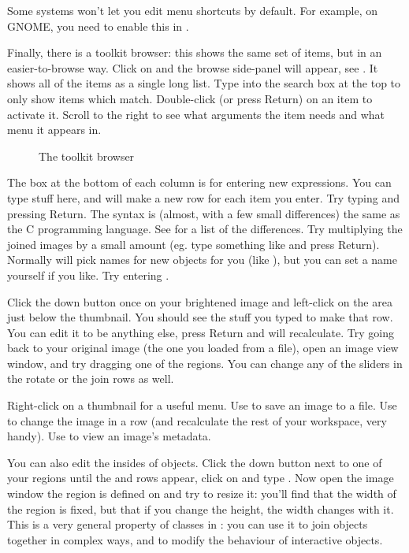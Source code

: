 Some systems won't let you edit menu shortcuts by default. For example,
on GNOME, you need to enable this in .

Finally, there is a toolkit browser: this shows the same set of items, but in
an easier-to-browse way. Click on  and the
browse side-panel will appear, see . It shows all of the items
as a single long list. Type into the search box at the top to only show items
which match. Double-click (or press Return) on an item to activate it. Scroll
to the right to see what arguments the item needs and what menu it appears in.

\begin{figure}
\caption{The toolkit browser}
\end{figure}

The box at the bottom of each column is for entering new expressions. You
can type stuff here, and \nip{} will make a new row for each item you
enter. Try typing  and pressing Return. The syntax is (almost,
with a few small differences) the same as the C programming language. See
 for a list of the differences. Try
multiplying the joined images by a small amount (eg. type something like
 and press Return). Normally \nip{} will pick names for new
objects for you (like ), but you can set a name yourself if you like.
Try entering .

Click the down button once on your brightened image and left-click on the area
just below the thumbnail. You should see the stuff you typed to make that row.
You can edit it to be anything else, press Return and \nip{} will recalculate.
Try going back to your original image (the one you loaded from a file),
open an image view window, and try dragging one of the regions. You can
change any of the sliders in the rotate or the join rows as well.  

Right-click on a thumbnail for a useful menu. Use  to save an
image to a file. Use  to change the image in a row (and
recalculate the rest of your workspace, very handy). Use  to view
an image's metadata. 

You can also edit the insides of objects. Click the down button next to
one of your regions until the  and  rows appear, click on
 and type . Now open the image window the region is
defined on and try to resize it: you'll find that the width of the region is
fixed, but that if you change the height, the width changes with it. This is a
very general property of classes in \nip{}: you can use it to join objects
together in complex ways, and to modify the behaviour of interactive objects. 

